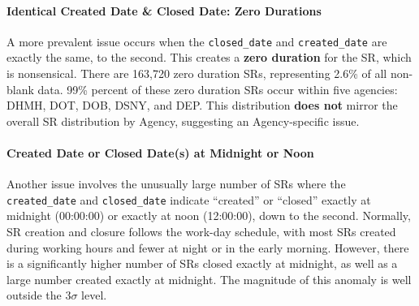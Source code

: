 \documentclass[linenumber]{jdsart}
\begin{document}
\paragraph{Identical Created Date \& Closed Date: Zero Durations}
A more prevalent issue occurs when the \texttt{closed\_date} and 
\texttt{created\_date} are exactly the same, to the second. This 
creates a \textbf{zero duration} for the SR, which is nonsensical. There 
are 163,720 zero duration SRs, representing 2.6\% of all non\mbox{-}blank data. 
99\% percent of these zero duration SRs occur within five agencies:
DHMH, DOT, DOB, DSNY, and DEP. This distribution \textbf{does not} 
mirror the overall SR distribution by Agency, suggesting 
an Agency\mbox{-}specific issue.
	
\paragraph{Created Date or Closed Date(s) at Midnight or Noon}
Another issue involves the unusually large number of 
SRs where the \texttt{created\_date} and \texttt{closed\_date} 
indicate ``created'' or ``closed'' exactly at midnight (00:00:00) or 
exactly at noon (12:00:00), down to the second. Normally, 
SR creation and closure follows the work\mbox{-}day schedule, 
with most SRs created during working hours and 
fewer at night or in the early morning. However, there is a 
significantly higher number of SRs closed exactly at midnight, 
as well as a large number created exactly at midnight. The magnitude
of this anomaly is well outside the 3$\sigma$ level. 
\end{document}

